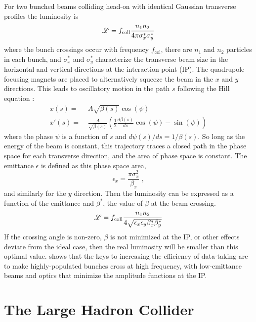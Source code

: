 For two bunched beams colliding head-on with identical Gaussian transverse profiles the luminosity is
\begin{equation}
\mathscr{L} = f_\mathrm{coll} \frac{n_1 n_2}{4 \pi \sigma_x^* \sigma_y^*}
\end{equation}
where the bunch crossings occur with frequency $f_\mathrm{col}$, there are $n_1$ and $n_2$ particles in each bunch, and $\sigma_x^*$ and $\sigma_y^*$ characterize the transverse beam size in the horizontal and vertical directions at the interaction point (IP).
The quadrupole focusing magnets are placed to alternatively squeeze the beam in the $x$ and $y$ directions.
This leads to oscillatory motion in the path $s$ following the Hill equation \cite{Tanabashi:2018oca}:
\begin{align}
x(s) =& \; A \sqrt{\beta(s)} \cos (\psi) \\
x'(s) =& \; \frac{A}{\sqrt{\beta(s)}} \left( \frac{1}{2} \frac{d\beta(s)}{ds} \cos(\psi) - \sin(\psi) \right)
\end{align}
where the phase $\psi$ is a function of $s$ and $d\psi(s)/ds = 1/\beta(s)$.
So long as the energy of the beam is constant, this trajectory traces a closed path in the phase space for each transverse direction, and the area of phase space is constant.
The emittance $\epsilon$ is defined as this phase space area,
\begin{equation}
\epsilon_x = \frac{\pi \sigma_x^2}{\beta_x} \; ,
\end{equation}
and similarly for the $y$ direction.
Then the luminosity can be expressed as a function of the emittance and $\beta^*$, the value of $\beta$ at the beam crossing.
\begin{equation}
\label{eq:lumi}
\mathscr{L} = f_\mathrm{coll} \frac{n_1 n_2}{4 \sqrt{\epsilon_x \epsilon_y \beta_x^* \beta_y^*}}
\end{equation}
If the crossing angle is non-zero, $\beta$ is not minimized at the IP, or other effects deviate from the ideal case, then the real luminosity will be smaller than this optimal value.
 shows that the keys to increasing the efficiency of data-taking are to make highly-populated bunches cross at high frequency, with low-emittance beams and optics that minimize the amplitude functions at the IP.

\section{The Large Hadron Collider}

